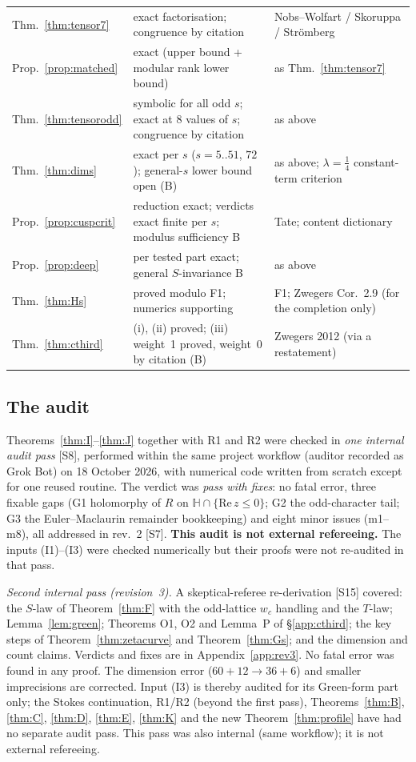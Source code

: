 \documentclass[11pt]{article}
\theoremstyle{definition}
\newcommand{\Hb}{\mathbb{H}}
\newcommand{\src}[1]{\textup{[S#1]}}
\begin{document}
\begin{center}
\begin{longtable}{p{2.6cm}p{6.6cm}p{5.6cm}}
Thm.~\ref{thm:tensor7} & exact factorisation; congruence by citation & Nobs--Wolfart / Skoruppa / Str\"omberg\\
Prop.~\ref{prop:matched} & exact (upper bound + modular rank lower bound) & as Thm.~\ref{thm:tensor7}\\
Thm.~\ref{thm:tensorodd} & symbolic for all odd $s$; exact at $8$ values of $s$; congruence by citation & as above\\
Thm.~\ref{thm:dims} & exact per $s$ ($s=5..51$, $72$); general-$s$ lower bound open (B) & as above; $\lambda=\tfrac14$ constant-term criterion\\
Prop.~\ref{prop:cuspcrit} & reduction exact; verdicts exact finite per $s$; modulus sufficiency B & Tate; content dictionary\\
Prop.~\ref{prop:deep} & per tested part exact; general $S$-invariance B & as above\\
Thm.~\ref{thm:Hs} & proved modulo F1; numerics supporting & F1; Zwegers Cor.~2.9 (for the completion only)\\
Thm.~\ref{thm:cthird} & (i), (ii) proved; (iii) weight~1 proved, weight~0 by citation (B) & Zwegers 2012 (via a restatement)\\\bottomrule
\end{longtable}
\end{center}

\subsection{The audit}\label{sec:audit}
Theorems~\ref{thm:I}--\ref{thm:J} together with R1 and R2 were checked in \emph{one internal audit pass} \src{8}, performed within the same project
workflow (auditor recorded as Grok Bot) on 18 October 2026, with numerical code written from scratch except for one reused routine. The verdict was
\emph{pass with fixes}: no fatal error, three fixable gaps (G1 holomorphy of $R$ on $\Hb\cap\{\mathrm{Re}\,z\le0\}$; G2 the odd-character tail; G3
the Euler--Maclaurin remainder bookkeeping) and eight minor issues (m1--m8), all addressed in rev.~2 \src{7}. \textbf{This audit is not external
refereeing.} The inputs (I1)--(I3) were checked numerically but their proofs were not re-audited in that pass.

\emph{Second internal pass (revision~3).} A skeptical-referee re-derivation \src{15} covered: the $S$-law of Theorem~\ref{thm:F} with the odd-lattice
$w_c$ handling and the $T$-law; Lemma~\ref{lem:green}; Theorems O1, O2 and Lemma~P of \S\ref{app:cthird}; the key steps of
Theorem~\ref{thm:zetacurve} and Theorem~\ref{thm:Gs}; and the dimension and count claims. Verdicts and fixes are in Appendix~\ref{app:rev3}. No fatal
error was found in any proof. The dimension error ($60+12\to36+6$) and smaller imprecisions are corrected. Input (I3) is thereby audited for its Green-form part
only; the Stokes continuation, R1/R2 (beyond the first pass), Theorems~\ref{thm:B}, \ref{thm:C}, \ref{thm:D}, \ref{thm:E}, \ref{thm:K} and the new
Theorem~\ref{thm:profile} have had no separate audit pass. This pass was also internal (same workflow); it is not external refereeing.
\end{document}
